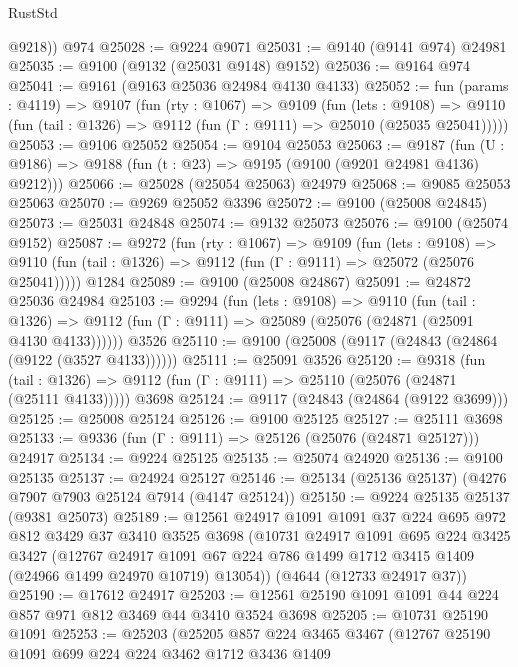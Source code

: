 \begin{lexlean}{RustStd}
\begin{coremodule}
        @9218))
    @974
@25028 := @9224 @9071
@25031 := @9140 (@9141 @974) @24981
@25035 := @9100 (@9132 (@25031 @9148) @9152)
@25036 := @9164 @974
@25041 := @9161 (@9163 @25036 @24984 @4130 @4133)
@25052 := fun (params : @4119) =>
  @9107
    (fun (rty : @1067) =>
    @9109
      (fun (lets : @9108) =>
      @9110 (fun (tail : @1326) => @9112 (fun (Γ : @9111) => @25010 (@25035 @25041)))))
@25053 := @9106 @25052
@25054 := @9104 @25053
@25063 := @9187
    (fun (U : @9186) => @9188 (fun (t : @23) => @9195 (@9100 (@9201 @24981 @4136) @9212)))
@25066 := @25028 (@25054 @25063) @24979
@25068 := @9085 @25053 @25063
@25070 := @9269 @25052 @3396
@25072 := @9100 (@25008 @24845)
@25073 := @25031 @24848
@25074 := @9132 @25073
@25076 := @9100 (@25074 @9152)
@25087 := @9272
    (fun (rty : @1067) =>
    @9109
      (fun (lets : @9108) =>
      @9110 (fun (tail : @1326) => @9112 (fun (Γ : @9111) => @25072 (@25076 @25041)))))
    @1284
@25089 := @9100 (@25008 @24867)
@25091 := @24872 @25036 @24984
@25103 := @9294
    (fun (lets : @9108) =>
    @9110
      (fun (tail : @1326) =>
      @9112 (fun (Γ : @9111) => @25089 (@25076 (@24871 (@25091 @4130 @4133))))))
    @3526
@25110 := @9100 (@25008 (@9117 (@24843 (@24864 (@9122 (@3527 @4133))))))
@25111 := @25091 @3526
@25120 := @9318
    (fun (tail : @1326) => @9112 (fun (Γ : @9111) => @25110 (@25076 (@24871 (@25111 @4133)))))
    @3698
@25124 := @9117 (@24843 (@24864 (@9122 @3699)))
@25125 := @25008 @25124
@25126 := @9100 @25125
@25127 := @25111 @3698
@25133 := @9336 (fun (Γ : @9111) => @25126 (@25076 (@24871 @25127))) @24917
@25134 := @9224 @25125
@25135 := @25074 @24920
@25136 := @9100 @25135
@25137 := @24924 @25127
@25146 := @25134 (@25136 @25137) (@4276 @7907 @7903 @25124 @7914 (@4147 @25124))
@25150 := @9224 @25135 @25137 (@9381 @25073)
@25189 := @12561
    @24917
    @1091
    @1091
    @37
    @224
    @695
    @972
    @812
    @3429
    @37
    @3410
    @3525
    @3698
    (@10731
      @24917
      @1091
      @695
      @224
      @3425
      @3427
      (@12767
        @24917
        @1091
        @67
        @224
        @786
        @1499
        @1712
        @3415
        @1409
        (@24966 @1499 @24970 @10719)
        @13054))
    (@4644 (@12733 @24917 @37))
@25190 := @17612 @24917
@25203 := @12561 @25190 @1091 @1091 @44 @224 @857 @971 @812 @3469 @44 @3410 @3524 @3698
@25205 := @10731 @25190 @1091
@25253 := @25203
    (@25205
      @857
      @224
      @3465
      @3467
      (@12767
        @25190
        @1091
        @699
        @224
        @224
        @3462
        @1712
        @3436
        @1409

\end{coremodule}
\end{lexlean}
